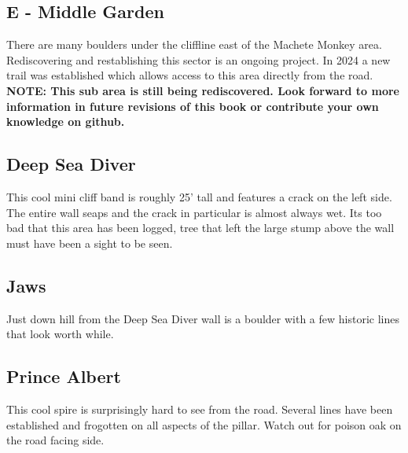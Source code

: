 	\begin{multicols}{2}

\null\newpage

\section{E - Middle Garden}\label{sa:Middle Garden}

There are many boulders under the cliffline east of the Machete Monkey area. Rediscovering and restablishing this sector is an ongoing project. In 2024 a new trail was established which allows access to this area directly from the road.\\
\textbf{NOTE: This sub area is still being rediscovered. Look forward to more information in future revisions of this book or contribute your own knowledge on github.}\\




\needspace{10em}
\subsection*{Deep Sea Diver}\label{bf:Deep Sea Diver}

This cool mini cliff band is roughly 25' tall and features a crack on the left side. The entire wall seaps and the crack in particular is almost always wet. Its too bad that this area has been logged, tree that left the large stump above the wall must have been a sight to be seen.\\




\needspace{10em}
\subsection*{Jaws}\label{bf:Jaws}

Just down hill from the Deep Sea Diver wall is a boulder with a few historic lines that look worth while.\\




\needspace{10em}
\subsection*{Prince Albert}\label{bf:Prince Albert}

This cool spire is surprisingly hard to see from the road. Several lines have been established and frogotten on all aspects of the pillar. Watch out for poison oak on the road facing side.\\





\end{multicols}
\clearpage